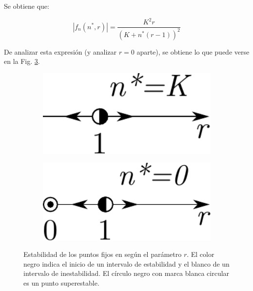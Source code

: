 \documentclass[twocolumn,aps,prl]{revtex4-1}
\newcommand{\nstar}{n^*}
\begin{document}
Se obtiene que:

$$
|f_{n}\left(n^{*},r\right)|=\frac{K^{2} r}{(K+\nstar(r-1))^{2}}
$$

De analizar esta expresión (y analizar $r=0$ aparte), se obtiene lo que puede verse en la Fig. \ref{fig:estabilidad}.

\begin{figure}[ht!]
    \centering
    \begin{subfigure}[b]{0.3\linewidth}
        \centering
        \includegraphics[width = 0.999\textwidth]{figuras/estabilidadK.pdf}
        \caption{}
        \label{fig:figuras/estabilidadK}
    \end{subfigure}\qquad\qquad\quad
    \begin{subfigure}[b]{0.3\linewidth}
        \centering
        \includegraphics[width = 0.999\textwidth]{figuras/estable0.pdf}
        \caption{}
        \label{fig:figuras/estable0}
    \end{subfigure}\quad
    \caption{Estabilidad de los puntos fijos en según el parámetro $r$. El color negro indica el inicio de un intervalo de estabilidad y el blanco de un intervalo de inestabilidad. El círculo negro con marca blanca circular es un punto superestable.}
    \label{fig:estabilidad}
\end{figure}
\end{document}
